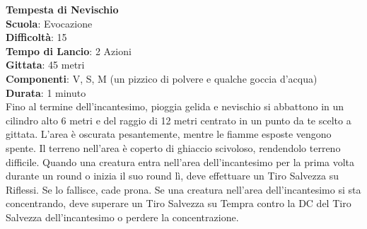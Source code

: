 \begin{multicols}{2}
\medskip\textbf{Tempesta di Nevischio}\\
\textbf{Scuola}: Evocazione\\
\textbf{Difficoltà}:  15\\
\textbf{Tempo di Lancio}: 2 Azioni\\
\textbf{Gittata}: 45 metri\\
\textbf{Componenti}: V, S, M (un pizzico di polvere e qualche goccia d’acqua)\\
\textbf{Durata}: 1 minuto\\
Fino al termine dell'incantesimo, pioggia gelida e nevischio si abbattono in un cilindro alto 6 metri e del raggio di 12 metri centrato in un punto da te scelto a gittata. L’area è oscurata pesantemente, mentre le fiamme esposte vengono spente. Il terreno nell'area è coperto di ghiaccio scivoloso, rendendolo terreno difficile. Quando una creatura entra nell'area dell'incantesimo per la prima volta durante un round o inizia il suo round lì, deve effettuare un Tiro Salvezza su Riflessi. Se lo fallisce, cade prona. Se una creatura nell'area dell'incantesimo si sta concentrando, deve superare un Tiro Salvezza su Tempra contro la DC del Tiro Salvezza dell'incantesimo o perdere la concentrazione. 


\end{multicols}
